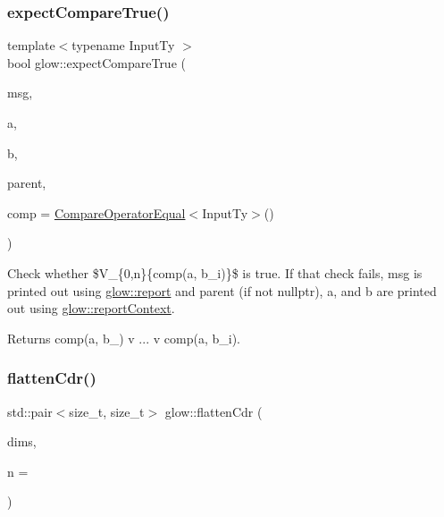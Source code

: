 \subsubsection{\texorpdfstring{expect\+Compare\+True()}{expectCompareTrue()}\hspace{0.1cm}{\footnotesize\ttfamily [2/2]}}
{\footnotesize\ttfamily template$<$typename Input\+Ty $>$ \\
bool glow\+::expect\+Compare\+True (\begin{DoxyParamCaption}\item[{const char $\ast$}]{msg,  }\item[{const Input\+Ty \&}]{a,  }\item[{llvm\+::\+Array\+Ref$<$ Input\+Ty $>$}]{b,  }\item[{const \hyperlink{classglow_1_1_node}{Node} $\ast$}]{parent,  }\item[{const \hyperlink{structglow_1_1_compare_with_name}{Compare\+With\+Name}$<$ Input\+Ty $>$ \&}]{comp = {\ttfamily \hyperlink{structglow_1_1_compare_operator_equal}{Compare\+Operator\+Equal}$<$InputTy$>$()} }\end{DoxyParamCaption})}

Check whether \$\+V\+\_\+\{0,n\}\{comp({\ttfamily a}, {\ttfamily b\+\_\+i})\}\$ is true. If that check fails, {\ttfamily msg} is printed out using \hyperlink{namespaceglow_a9d164b45d9fb735f448cd7985bcdf203}{glow\+::report} and {\ttfamily parent} (if not nullptr), {\ttfamily a}, and {\ttfamily b} are printed out using \hyperlink{namespaceglow_a5efbd9d8157489eb3b55e5c9fafb5fb7}{glow\+::report\+Context}. \begin{DoxyReturn}{Returns}
{\ttfamily comp}({\ttfamily a}, {\ttfamily b\+\_}) v ... v comp({\ttfamily a}, {\ttfamily b\+\_\+i}). 
\end{DoxyReturn}
\mbox{\label{namespaceglow_a47d2c5f23a3db76b44bbf76e2d41f60d}} 
\subsubsection{\texorpdfstring{flatten\+Cdr()}{flattenCdr()}}
{\footnotesize\ttfamily std\+::pair$<$size\+\_\+t, size\+\_\+t$>$ glow\+::flatten\+Cdr (\begin{DoxyParamCaption}\item[{llvm\+::\+Array\+Ref$<$ size\+\_\+t $>$}]{dims,  }\item[{\hyperlink{namespaceglow_a0ca574644e1e42ef193a9947fb4d8911}{unsigned\+\_\+t}}]{n = {} }\end{DoxyParamCaption})\hspace{0.3cm}{\ttfamily [inline]}}

